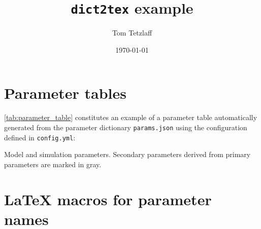 \documentclass[10pt,a4paper,american]{article}
\begin{document}
\title{\texttt{dict2tex} example}
\author{Tom Tetzlaff}
\date{\today}

\maketitle
\tableofcontents

\section{Parameter tables}

\cref{tab:parameter_table} constitutes an example of a parameter table automatically generated from the parameter dictionary \texttt{params.json} using the configuration defined in \texttt{config.yml}: 
\begin{table}[ht!]
\begin{center}
  \parbox{0.8\linewidth}{       %
    \small%
    \centering%
    \renewcommand{\arraystretch}{1.5}%
    \noindent%
    \caption{Model and simulation parameters. Secondary parameters derived from primary parameters are marked in gray.}
    \label{tab:parameter_table}
  }
\end{center}
\end{table}

\section{LaTeX macros for parameter names}

\end{document}
